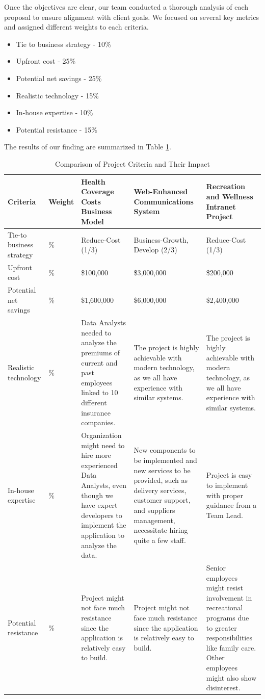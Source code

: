 Once the objectives are clear, our team conducted a thorough analysis of each proposal to ensure alignment with client goals. We focused on several key metrics and assigned different weights to each criteria.

\begin{itemize}
    \item Tie to business strategy - 10\%
    \item Upfront cost - 25\%
    \item Potential net savings - 25\%
    \item Realistic technology - 15\%
    \item In-house expertise - 10\%
    \item Potential resistance - 15\%
\end{itemize}
The results of our finding are summarized in Table \ref{tab:project_com}.

\begin{table}[h]
    \centering
    \begin{tabularx}{\textwidth}{>{\hsize=0.7\hsize}X>{\hsize=0.5\hsize}X>{\hsize=1.2\hsize}X>{\hsize=1.3\hsize}X>{\hsize=1.3\hsize}X}
    \toprule
    \textbf{Criteria} & \textbf{Weight} & \textbf{Health Coverage Costs Business Model} & \textbf{Web-Enhanced Communications System} & \textbf{Recreation and Wellness Intranet Project} \\
    \midrule
    Tie-to business strategy & 10\% & Reduce-Cost (1/3) & Business-Growth, Develop (2/3) & Reduce-Cost (1/3) \\
    Upfront cost & 25\% & \$100,000 & \$3,000,000 & \$200,000 \\
    Potential net savings & 25\% & \$1,600,000 & \$6,000,000 & \$2,400,000 \\
    Realistic technology & 15\% & Data Analysts needed to analyze the premiums of current and past employees linked to 10 different insurance companies. & The project is highly achievable with modern technology, as we all have experience with similar systems. & The project is highly achievable with modern technology, as we all have experience with similar systems. \\
    In-house expertise & 10\% & Organization might need to hire more experienced Data Analysts, even though we have expert developers to implement the application to analyze the data. & New components to be implemented and new services to be provided, such as delivery services, customer support, and suppliers management, necessitate hiring quite a few staff. & Project is easy to implement with proper guidance from a Team Lead. \\
    Potential resistance & 15\% & Project might not face much resistance since the application is relatively easy to build. & Project might not face much resistance since the application is relatively easy to build. & Senior employees might resist involvement in recreational programs due to greater responsibilities like family care. Other employees might also show disinterest. \\
    \bottomrule
    \end{tabularx}
    \caption{Comparison of Project Criteria and Their Impact}
    \label{tab:project_com}
\end{table}

